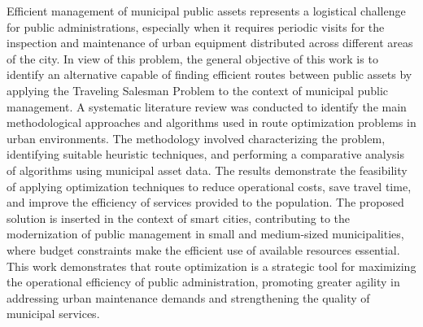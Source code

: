 Efficient management of municipal public assets represents a logistical challenge for public administrations, 
especially when it requires periodic visits for the inspection and maintenance of urban equipment distributed 
across different areas of the city. In view of this problem, the general objective of this work is to identify 
an alternative capable of finding efficient routes between public assets by applying the Traveling Salesman 
Problem to the context of municipal public management. A systematic literature review was conducted to identify 
the main methodological approaches and algorithms used in route optimization problems in urban environments. 
The methodology involved characterizing the problem, identifying suitable heuristic techniques, and performing 
a comparative analysis of algorithms using municipal asset data. The results demonstrate the feasibility of 
applying optimization techniques to reduce operational costs, save travel time, and improve the efficiency of 
services provided to the population. The proposed solution is inserted in the context of smart cities, 
contributing to the modernization of public management in small and medium-sized municipalities, where budget 
constraints make the efficient use of available resources essential. This work demonstrates that route optimization 
is a strategic tool for maximizing the operational efficiency of public administration, promoting greater agility 
in addressing urban maintenance demands and strengthening the quality of municipal services.

